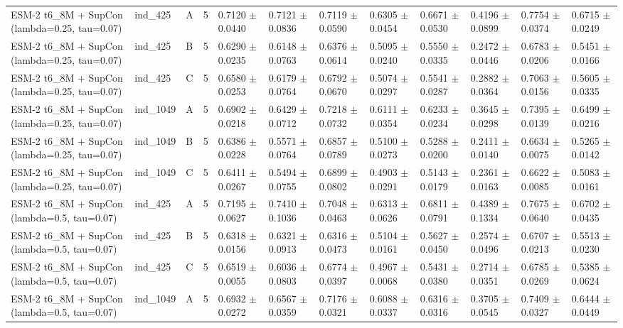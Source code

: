 \begin{table}[ht]
\begin{tabular}{llllllllllll}
ESM-2 t6\_8M + SupCon (lambda=0.25, tau=0.07) & ind\_425 & A & 5 & 0.7120 $\pm$ 0.0440 & 0.7121 $\pm$ 0.0836 & 0.7119 $\pm$ 0.0590 & 0.6305 $\pm$ 0.0454 & 0.6671 $\pm$ 0.0530 & 0.4196 $\pm$ 0.0899 & 0.7754 $\pm$ 0.0374 & 0.6715 $\pm$ 0.0249 \\
ESM-2 t6\_8M + SupCon (lambda=0.25, tau=0.07) & ind\_425 & B & 5 & 0.6290 $\pm$ 0.0235 & 0.6148 $\pm$ 0.0763 & 0.6376 $\pm$ 0.0614 & 0.5095 $\pm$ 0.0240 & 0.5550 $\pm$ 0.0335 & 0.2472 $\pm$ 0.0446 & 0.6783 $\pm$ 0.0206 & 0.5451 $\pm$ 0.0166 \\
ESM-2 t6\_8M + SupCon (lambda=0.25, tau=0.07) & ind\_425 & C & 5 & 0.6580 $\pm$ 0.0253 & 0.6179 $\pm$ 0.0764 & 0.6792 $\pm$ 0.0670 & 0.5074 $\pm$ 0.0297 & 0.5541 $\pm$ 0.0287 & 0.2882 $\pm$ 0.0364 & 0.7063 $\pm$ 0.0156 & 0.5605 $\pm$ 0.0335 \\
ESM-2 t6\_8M + SupCon (lambda=0.25, tau=0.07) & ind\_1049 & A & 5 & 0.6902 $\pm$ 0.0218 & 0.6429 $\pm$ 0.0712 & 0.7218 $\pm$ 0.0732 & 0.6111 $\pm$ 0.0354 & 0.6233 $\pm$ 0.0234 & 0.3645 $\pm$ 0.0298 & 0.7395 $\pm$ 0.0139 & 0.6499 $\pm$ 0.0216 \\
ESM-2 t6\_8M + SupCon (lambda=0.25, tau=0.07) & ind\_1049 & B & 5 & 0.6386 $\pm$ 0.0228 & 0.5571 $\pm$ 0.0764 & 0.6857 $\pm$ 0.0789 & 0.5100 $\pm$ 0.0273 & 0.5288 $\pm$ 0.0200 & 0.2411 $\pm$ 0.0140 & 0.6634 $\pm$ 0.0075 & 0.5265 $\pm$ 0.0142 \\
ESM-2 t6\_8M + SupCon (lambda=0.25, tau=0.07) & ind\_1049 & C & 5 & 0.6411 $\pm$ 0.0267 & 0.5494 $\pm$ 0.0755 & 0.6899 $\pm$ 0.0802 & 0.4903 $\pm$ 0.0291 & 0.5143 $\pm$ 0.0179 & 0.2361 $\pm$ 0.0163 & 0.6622 $\pm$ 0.0085 & 0.5083 $\pm$ 0.0161 \\
ESM-2 t6\_8M + SupCon (lambda=0.5, tau=0.07) & ind\_425 & A & 5 & 0.7195 $\pm$ 0.0627 & 0.7410 $\pm$ 0.1036 & 0.7048 $\pm$ 0.0463 & 0.6313 $\pm$ 0.0626 & 0.6811 $\pm$ 0.0791 & 0.4389 $\pm$ 0.1334 & 0.7675 $\pm$ 0.0640 & 0.6702 $\pm$ 0.0435 \\
ESM-2 t6\_8M + SupCon (lambda=0.5, tau=0.07) & ind\_425 & B & 5 & 0.6318 $\pm$ 0.0156 & 0.6321 $\pm$ 0.0913 & 0.6316 $\pm$ 0.0473 & 0.5104 $\pm$ 0.0161 & 0.5627 $\pm$ 0.0450 & 0.2574 $\pm$ 0.0496 & 0.6707 $\pm$ 0.0213 & 0.5513 $\pm$ 0.0230 \\
ESM-2 t6\_8M + SupCon (lambda=0.5, tau=0.07) & ind\_425 & C & 5 & 0.6519 $\pm$ 0.0055 & 0.6036 $\pm$ 0.0803 & 0.6774 $\pm$ 0.0397 & 0.4967 $\pm$ 0.0068 & 0.5431 $\pm$ 0.0380 & 0.2714 $\pm$ 0.0351 & 0.6785 $\pm$ 0.0269 & 0.5385 $\pm$ 0.0624 \\
ESM-2 t6\_8M + SupCon (lambda=0.5, tau=0.07) & ind\_1049 & A & 5 & 0.6932 $\pm$ 0.0272 & 0.6567 $\pm$ 0.0359 & 0.7176 $\pm$ 0.0321 & 0.6088 $\pm$ 0.0337 & 0.6316 $\pm$ 0.0316 & 0.3705 $\pm$ 0.0545 & 0.7409 $\pm$ 0.0327 & 0.6444 $\pm$ 0.0449 \\

\end{tabular}
\end{table}
